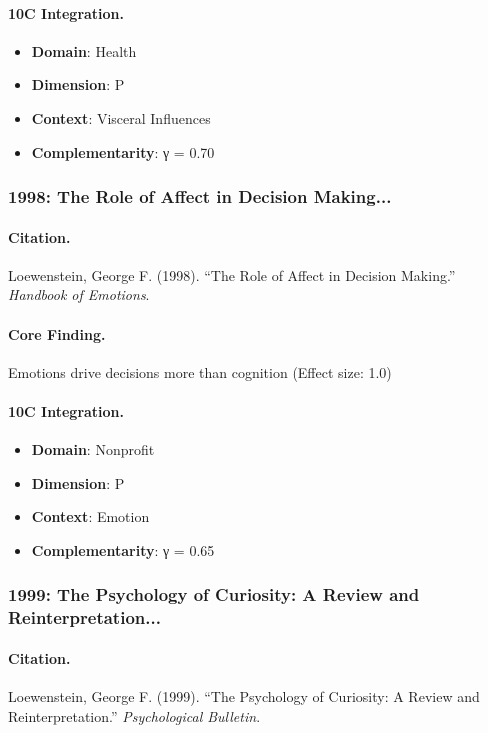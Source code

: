 \paragraph{10C Integration.}
\begin{itemize}[nosep]
  \item \textbf{Domain}: Health
  \item \textbf{Dimension}: P
  \item \textbf{Context}: Visceral Influences
  \item \textbf{Complementarity}: γ = 0.70
\end{itemize}

\subsubsection{1998: The Role of Affect in Decision Making...}

\paragraph{Citation.}
Loewenstein, George F. (1998). ``The Role of Affect in Decision Making.''
\textit{Handbook of Emotions}.

\paragraph{Core Finding.}
Emotions drive decisions more than cognition (Effect size: 1.0)

\paragraph{10C Integration.}
\begin{itemize}[nosep]
  \item \textbf{Domain}: Nonprofit
  \item \textbf{Dimension}: P
  \item \textbf{Context}: Emotion
  \item \textbf{Complementarity}: γ = 0.65
\end{itemize}

\subsubsection{1999: The Psychology of Curiosity: A Review and Reinterpretation...}

\paragraph{Citation.}
Loewenstein, George F. (1999). ``The Psychology of Curiosity: A Review and Reinterpretation.''
\textit{Psychological Bulletin}.

